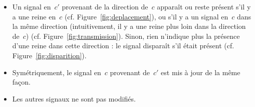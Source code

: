  \begin{itemize} 

\item{%
Un signal en~$c'$ provenant de la direction de~$c$ apparaît ou reste présent s'il y a une reine en~$c$ (cf. Figure~\ref{fig:deplacement}), ou s'il y a un signal en~$c$ dans la même direction (intuitivement, il y a une reine plus loin dans la direction de~$c$) (cf. Figure~\ref{fig:transmission}). Sinon, rien n'indique plus la présence d'une reine dans cette direction : le signal disparaît s'il était présent (cf. Figure~\ref{fig:disparition}). }

\item{ Symétriquement, le signal en~$c$ provenant de~$c'$ est mis à jour de la même façon.}

\item{ Les autres signaux ne sont pas modifiés. }
  


\end{itemize}

